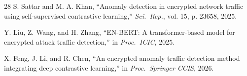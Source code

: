 \documentclass[conference]{IEEEtran}
\begin{document}
\begin{thebibliography}{28}
S. Sattar and M. A. Khan, ``Anomaly detection in encrypted network traffic using self-supervised contrastive learning,'' \emph{Sci.\ Rep.}, vol. 15, p. 23658, 2025.

Y. Liu, Z. Wang, and H. Zhang, ``EN-BERT: A transformer-based model for encrypted attack traffic detection,'' in \emph{Proc.\ ICIC}, 2025.

X. Feng, J. Li, and R. Chen, ``An encrypted anomaly traffic detection method integrating deep contrastive learning,'' in \emph{Proc.\ Springer CCIS}, 2026.

\end{thebibliography}
\end{document}
